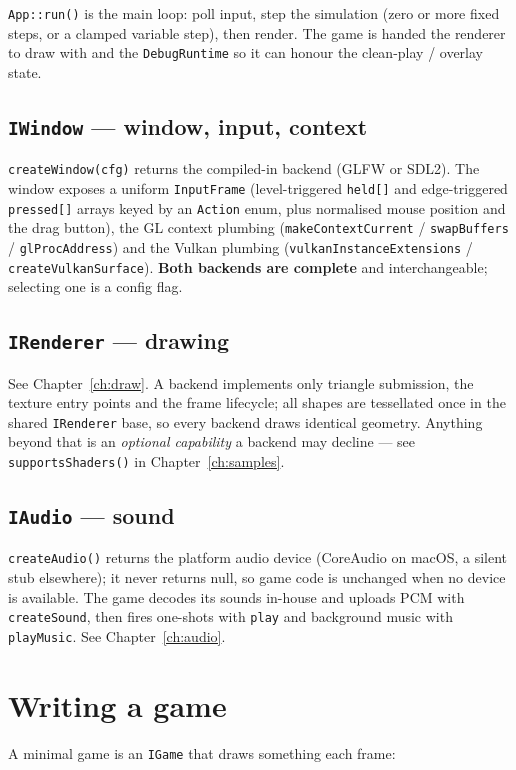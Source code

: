 \documentclass[11pt]{report}
\newcommand{\code}[1]{\texttt{#1}}
\begin{document}
\code{App::run()} is the main loop: poll input, step the simulation (zero or more
fixed steps, or a clamped variable step), then render. The game is handed the
renderer to draw with and the \code{DebugRuntime} so it can honour the
clean-play / overlay state.

\section{\code{IWindow} --- window, input, context}
\code{createWindow(cfg)} returns the compiled-in backend (GLFW or SDL2). The
window exposes a uniform \code{InputFrame} (level-triggered \code{held[]} and
edge-triggered \code{pressed[]} arrays keyed by an \code{Action} enum, plus
normalised mouse position and the drag button), the GL context plumbing
(\code{makeContextCurrent} / \code{swapBuffers} / \code{glProcAddress}) and the
Vulkan plumbing (\code{vulkanInstanceExtensions} / \code{createVulkanSurface}).
\textbf{Both backends are complete} and interchangeable; selecting one is a
config flag.

\section{\code{IRenderer} --- drawing}
See Chapter~\ref{ch:draw}. A backend implements only triangle submission, the
texture entry points and the frame lifecycle; all shapes are tessellated once in
the shared \code{IRenderer} base, so every backend draws identical geometry.
Anything beyond that is an \emph{optional capability} a backend may decline ---
see \code{supportsShaders()} in Chapter~\ref{ch:samples}.

\section{\code{IAudio} --- sound}
\code{createAudio()} returns the platform audio device (CoreAudio on macOS, a
silent stub elsewhere); it never returns null, so game code is unchanged when no
device is available. The game decodes its sounds in-house and uploads PCM with
\code{createSound}, then fires one-shots with \code{play} and background music
with \code{playMusic}. See Chapter~\ref{ch:audio}.

\chapter{Writing a game}
A minimal game is an \code{IGame} that draws something each frame:
\end{document}
